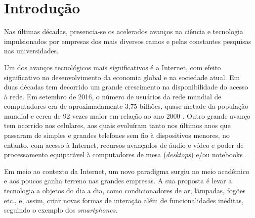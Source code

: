 \chapter{Introdução}

Nas últimas décadas, presencia-se os acelerados avanços na ciência e tecnologia impulsionados por empresas dos mais diversos ramos e pelas constantes pesquisas nas universidades. 

Um dos avanços tecnológicos mais significativos é a Internet, com efeito significativo no desenvolvimento da economia global e na sociedade atual. Em duas décadas tem decorrido um grande crescimento na disponibilidade do acesso à rede. Em setembro de 2016, o número de usuários da rede mundial de computadores era de aproximadamente 3,75 bilhões, quase metade da população mundial e cerca de 92 vezes maior em relação ao ano 2000 \cite{MiniwattsMarketingGroup2016}.  Outro grande avanço tem ocorrido nos celulares, aos quais evoluíram tanto nos últimos anos que passaram de simples e grandes telefones sem fio à dispositivos menores, no entanto, com acesso à Internet, recursos avançados de áudio e vídeo e poder de processamento equiparável à computadores de mesa (\textit{desktops}) e/ou notebooks \cite{Meyers2011, Woyke2014}.

Em meio ao contexto da Internet, um novo paradigma surgiu no meio acadêmico e aos poucos ganha terreno nas grandes empresas. A sua proposta é levar a tecnologia a objetos do dia a dia, como condicionadores de ar, lâmpadas, fogões etc., e, assim, criar novas formas de interação além de funcionalidades inéditas, seguindo o exemplo dos \textit{smartphones}. 

